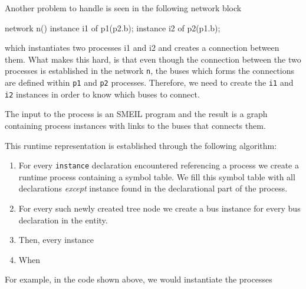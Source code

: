 



Another problem to handle is seen in the following network block
\begin{smeilcode}
  network n() {
    instance i1 of p1(p2.b);
    instance i2 of p2(p1.b);
  }
\end{smeilcode}
which instantiates two processes i1 and i2 and creates a connection between
them. What makes this hard, is that even though the connection between the two
processes is established in the network {\tt n}, the buses which forms the
connections are defined within {\tt p1} and {\tt p2} processes. Therefore, we
need to create the {\tt i1} and {\tt i2} instances in order to know which buses
to connect.


The input to the process is an SMEIL program and the result is a graph
containing process instances with links to the buses that connects
them.


This runtime representation is established through the following
algorithm:
\begin{enumerate}
\item For every {\tt instance} declaration encountered referencing a process we
  create a runtime process containing a symbol table. We fill this symbol table
  with all declarations {\itshape except} instance found in the declarational
  part of the process.
    
  \item For every such newly created tree node we create a bus instance for
    every bus declaration in the entity.
  \item Then, every instance
  \item When
\end{enumerate}

For example, in the code shown above, we would instantiate the processes


